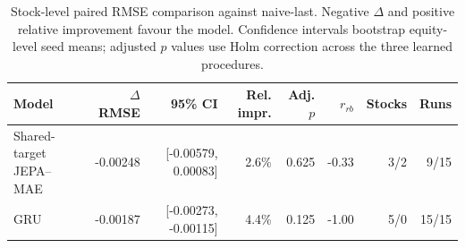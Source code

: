 \begin{table}[t]
\centering
\small
\caption{Stock-level paired RMSE comparison against naive-last. Negative $\Delta$ and positive relative improvement favour the model. Confidence intervals bootstrap equity-level seed means; adjusted $p$ values use Holm correction across the three learned procedures.}
\label{tab:paired_rmse_naive}
\begin{tabular}{lrrrrrrr}
\toprule
Model & $\Delta$RMSE & 95\% CI & Rel. impr. & Adj. $p$ & $r_{rb}$ & Stocks & Runs \\
\midrule
Shared-target JEPA--MAE & -0.00248 & [-0.00579, 0.00083] & 2.6\% & 0.625 & -0.33 & 3/2 & 9/15 \\
GRU & -0.00187 & [-0.00273, -0.00115] & 4.4\% & 0.125 & -1.00 & 5/0 & 15/15 \\
\bottomrule
\end{tabular}
\end{table}

